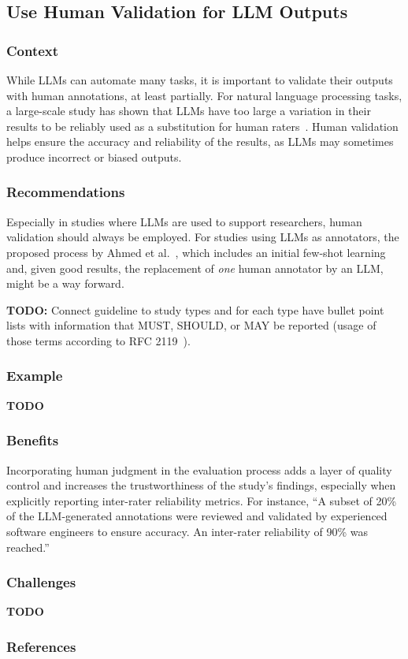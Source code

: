 \documentclass[11pt]{article}
\begin{document}
\subsection{Use Human Validation for LLM Outputs}

\subsubsection{Context}

While LLMs can automate many tasks, it is important to validate their outputs with human annotations, at least partially. For natural language processing tasks, a large-scale study has shown that LLMs have too large a variation in their results to be reliably used as a substitution for human raters~\cite{DBLP:journals/corr/abs-2406-18403}. Human validation helps ensure the accuracy and reliability of the results, as LLMs may sometimes produce incorrect or biased outputs.

\subsubsection{Recommendations}

Especially in studies where LLMs are used to support researchers, human validation should always be employed.
For studies using LLMs as annotators, the proposed process by Ahmed et al.~\cite{DBLP:journals/corr/abs-2408-05534}, which includes an initial few-shot learning and, given good results, the replacement of \emph{one} human annotator by an LLM, might be a way forward.

\textbf{TODO:} Connect guideline to study types and for each type have bullet point lists with information that MUST, SHOULD, or MAY be reported (usage of those terms according to RFC 2119~\cite{rfc2119}).

\subsubsection{Example}

\textbf{TODO}

\subsubsection{Benefits}

Incorporating human judgment in the evaluation process adds a layer of quality control and increases the trustworthiness of the study’s findings, especially when explicitly reporting inter-rater reliability metrics. For instance, ``A subset of 20\% of the LLM-generated annotations were reviewed and validated by experienced software engineers to ensure accuracy. An inter-rater reliability of 90\% was reached.''

\subsubsection{Challenges}

\textbf{TODO}

\subsubsection{References}



\end{document}
